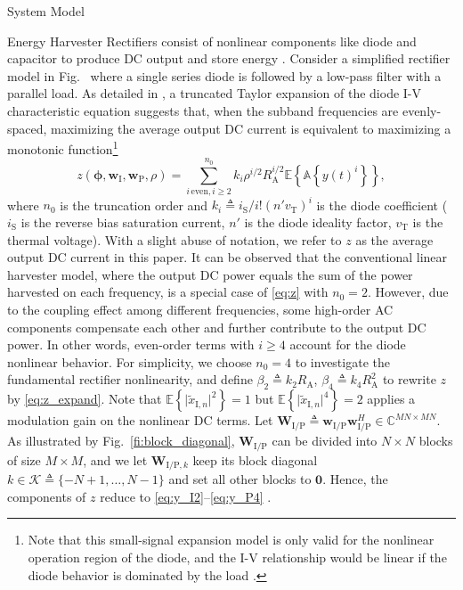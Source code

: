\documentclass[journal]{IEEEtran}
\begin{document}
\begin{section}{System Model}
\begin{subsection}{Energy Harvester}
			Rectifiers consist of nonlinear components like diode and capacitor to produce DC output and store energy \cite{Pinuela2013}. Consider a simplified rectifier model in Fig.~ where a single series diode is followed by a low-pass filter with a parallel load. As detailed in \cite{Clerckx2016a}, a truncated Taylor expansion of the diode I-V characteristic equation suggests that, when the subband frequencies are evenly-spaced, maximizing the average output DC current is equivalent to maximizing a monotonic function\footnote{Note that this small-signal expansion model is only valid for the nonlinear operation region of the diode, and the I-V relationship would be linear if the diode behavior is dominated by the load \cite{Clerckx2016a}.}
			\begin{equation}\label{eq:z}
				z(\boldsymbol{\phi},\boldsymbol{w}_{\mathrm{I}},\boldsymbol{w}_{\mathrm{P}},\rho)=\sum_{i\,\mathrm{even},i\ge2}^{n_0}{k_i}{\rho^{i/2}}{R_{\mathrm{A}}^{i/2}}{\mathbb{E}\left\{\mathbb{A}\left\{y(t)^i\right\}\right\}},
			\end{equation}
			where $n_0$ is the truncation order and $k_i \triangleq i_{\mathrm{S}}/i!(n'v_{\mathrm{T}})^i$ is the diode coefficient ($i_{\mathrm{S}}$ is the reverse bias saturation current, $n'$ is the diode ideality factor, $v_{\mathrm{T}}$ is the thermal voltage). With a slight abuse of notation, we refer to $z$ as the average output DC current in this paper. It can be observed that the conventional linear harvester model, where the output DC power equals the sum of the power harvested on each frequency, is a special case of \eqref{eq:z} with $n_0=2$. However, due to the coupling effect among different frequencies, some high-order AC components compensate each other and further contribute to the output DC power. In other words, even-order terms with $i \ge 4$ account for the diode nonlinear behavior. For simplicity, we choose $n_0=4$ to investigate the fundamental rectifier nonlinearity, and define $\beta_2 \triangleq {k_2}{R_{\mathrm{A}}}$, $\beta_4 \triangleq {k_4}{R_{\mathrm{A}}^2}$ to rewrite $z$ by \eqref{eq:z_expand}. Note that $\mathbb{E}\left\{\lvert\tilde{x}_{\mathrm{I},n}\rvert^2\right\}=1$ but $\mathbb{E}\left\{\lvert\tilde{x}_{\mathrm{I},n}\rvert^4\right\}=2$ applies a modulation gain on the nonlinear DC terms. Let $\boldsymbol{W}_{\mathrm{I/P}} \triangleq \boldsymbol{w}_{\mathrm{I/P}}\boldsymbol{w}_{\mathrm{I/P}}^H \in \mathbb{C}^{MN \times MN}$. As illustrated by Fig.~\ref{fi:block_diagonal}, $\boldsymbol{W}_{\mathrm{I/P}}$ can be divided into $N \times N$ blocks of size $M \times M$, and we let $\boldsymbol{W}_{\mathrm{I/P},k}$ keep its block diagonal $k \in \mathcal{K} \triangleq \{{-N+1},\dots,{N-1}\}$ and set all other blocks to $\boldsymbol{0}$. Hence, the components of $z$ reduce to \eqref{eq:y_I2}--\eqref{eq:y_P4} \cite{Golub2013}.


\end{subsection}
\end{section}
\end{document}
